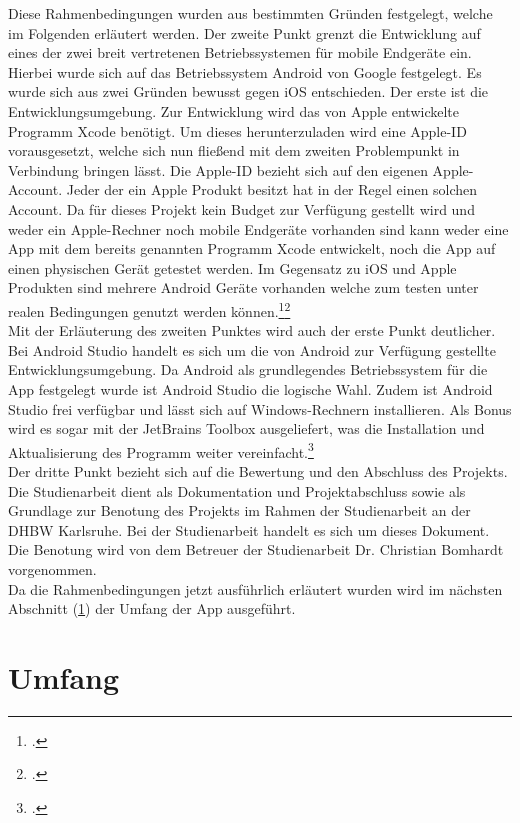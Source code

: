 Diese Rahmenbedingungen wurden aus bestimmten Gründen festgelegt, welche im Folgenden erläutert werden.
Der zweite Punkt grenzt die Entwicklung auf eines der zwei breit vertretenen Betriebssystemen für mobile Endgeräte ein. Hierbei wurde sich auf das Betriebssystem Android von Google festgelegt. Es wurde sich aus zwei Gründen bewusst gegen iOS entschieden. Der erste ist die Entwicklungsumgebung. Zur Entwicklung wird das von Apple entwickelte Programm Xcode benötigt. Um dieses herunterzuladen wird eine Apple-ID vorausgesetzt, welche sich nun fließend mit dem zweiten Problempunkt in Verbindung bringen lässt. Die Apple-ID bezieht sich auf den eigenen Apple-Account. Jeder der ein Apple Produkt besitzt hat in der Regel einen solchen Account. Da für dieses Projekt kein Budget zur Verfügung gestellt wird und weder ein Apple-Rechner noch mobile Endgeräte vorhanden sind kann weder eine App mit dem bereits genannten Programm Xcode entwickelt, noch die App auf einen physischen Gerät getestet werden. Im Gegensatz zu iOS und Apple Produkten sind mehrere Android Geräte vorhanden welche zum testen unter realen Bedingungen genutzt werden können.\footcite{chipIPhone.2019}\footcite{Xcode.2021} \\
Mit der Erläuterung des zweiten Punktes wird auch der erste Punkt deutlicher. Bei Android Studio handelt es sich um die von Android zur Verfügung gestellte Entwicklungsumgebung. Da Android als grundlegendes Betriebssystem für die App festgelegt wurde ist Android Studio die logische Wahl. Zudem ist Android Studio frei verfügbar und lässt sich auf Windows-Rechnern installieren. Als Bonus wird es sogar mit der JetBrains Toolbox ausgeliefert, was die Installation und Aktualisierung des Programm weiter vereinfacht.\footcite{AndroidStudio.2021} \\
Der dritte Punkt bezieht sich auf die Bewertung und den Abschluss des Projekts. Die Studienarbeit dient als Dokumentation und Projektabschluss sowie als Grundlage zur Benotung des Projekts im Rahmen der Studienarbeit an der \ac{DHBW} Karlsruhe. Bei der Studienarbeit handelt es sich um dieses Dokument. Die Benotung wird von dem Betreuer der Studienarbeit Dr. Christian Bomhardt vorgenommen.\\
Da die Rahmenbedingungen jetzt ausführlich erläutert wurden wird im nächsten Abschnitt (\ref{sec:umfang}) der Umfang der App ausgeführt.

\section{Umfang}\label{sec:umfang}

